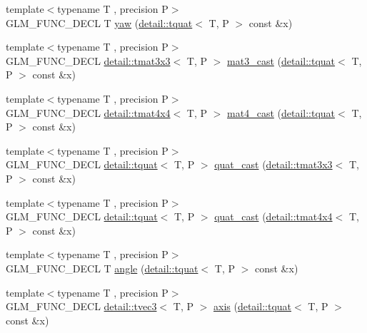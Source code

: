 \begin{DoxyCompactItemize}
\item 
{\footnotesize template$<$typename T , precision P$>$ }\\G\+L\+M\+\_\+\+F\+U\+N\+C\+\_\+\+D\+E\+CL T \hyperlink{group__gtc__quaternion_ga1de7653ddf380ff06d2300eea831664c}{yaw} (\hyperlink{structglm_1_1detail_1_1tquat}{detail\+::tquat}$<$ T, P $>$ const \&x)
\item 
{\footnotesize template$<$typename T , precision P$>$ }\\G\+L\+M\+\_\+\+F\+U\+N\+C\+\_\+\+D\+E\+CL \hyperlink{structglm_1_1detail_1_1tmat3x3}{detail\+::tmat3x3}$<$ T, P $>$ \hyperlink{group__gtc__quaternion_ga65257c3494022ad80a50ce11da95049d}{mat3\+\_\+cast} (\hyperlink{structglm_1_1detail_1_1tquat}{detail\+::tquat}$<$ T, P $>$ const \&x)
\item 
{\footnotesize template$<$typename T , precision P$>$ }\\G\+L\+M\+\_\+\+F\+U\+N\+C\+\_\+\+D\+E\+CL \hyperlink{structglm_1_1detail_1_1tmat4x4}{detail\+::tmat4x4}$<$ T, P $>$ \hyperlink{group__gtc__quaternion_gafc4e34c836f7ccb5f3bb2a0373c831e0}{mat4\+\_\+cast} (\hyperlink{structglm_1_1detail_1_1tquat}{detail\+::tquat}$<$ T, P $>$ const \&x)
\item 
{\footnotesize template$<$typename T , precision P$>$ }\\G\+L\+M\+\_\+\+F\+U\+N\+C\+\_\+\+D\+E\+CL \hyperlink{structglm_1_1detail_1_1tquat}{detail\+::tquat}$<$ T, P $>$ \hyperlink{group__gtc__quaternion_gafb826745dedb1760100bbd25d0f63fde}{quat\+\_\+cast} (\hyperlink{structglm_1_1detail_1_1tmat3x3}{detail\+::tmat3x3}$<$ T, P $>$ const \&x)
\item 
{\footnotesize template$<$typename T , precision P$>$ }\\G\+L\+M\+\_\+\+F\+U\+N\+C\+\_\+\+D\+E\+CL \hyperlink{structglm_1_1detail_1_1tquat}{detail\+::tquat}$<$ T, P $>$ \hyperlink{group__gtc__quaternion_ga385af22ef1a45c4464ddd28b80d5ce18}{quat\+\_\+cast} (\hyperlink{structglm_1_1detail_1_1tmat4x4}{detail\+::tmat4x4}$<$ T, P $>$ const \&x)
\item 
{\footnotesize template$<$typename T , precision P$>$ }\\G\+L\+M\+\_\+\+F\+U\+N\+C\+\_\+\+D\+E\+CL T \hyperlink{group__gtc__quaternion_ga23a3fc7ada5bbb665ff84c92c6e0542c}{angle} (\hyperlink{structglm_1_1detail_1_1tquat}{detail\+::tquat}$<$ T, P $>$ const \&x)
\item 
{\footnotesize template$<$typename T , precision P$>$ }\\G\+L\+M\+\_\+\+F\+U\+N\+C\+\_\+\+D\+E\+CL \hyperlink{structglm_1_1detail_1_1tvec3}{detail\+::tvec3}$<$ T, P $>$ \hyperlink{group__gtc__quaternion_ga8eef9f8c3f2e4836dccf09df975b20fb}{axis} (\hyperlink{structglm_1_1detail_1_1tquat}{detail\+::tquat}$<$ T, P $>$ const \&x)

\end{DoxyCompactItemize}
